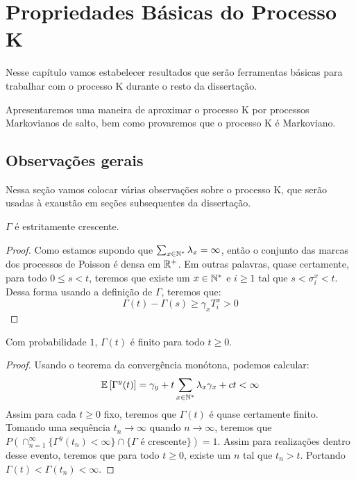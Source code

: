 \chapter{Propriedades Básicas do Processo K}
\label{cap:propriedades}

Nesse capítulo vamos estabelecer resultados que serão ferramentas
básicas para trabalhar com o processo K durante o resto da
dissertação.

Apresentaremos uma maneira de aproximar o processo K por processos
Markovianos de salto, bem como provaremos que o processo K é
Markoviano.


\section{Observações gerais}
\label{sec:observacoes}

Nessa seção vamos colocar várias observações sobre o processo K, que
serão usadas à exaustão em seções subsequentes da dissertação.

\begin{proposicao}
  \label{prop:gamma-crescente}
  $\Gamma$ é \qc estritamente crescente.
\end{proposicao}
\begin{proof}
  Como estamos supondo que $\sum_{x \in {\mathbb{N^*}}} \lambda_x = \infty$,
  então o conjunto das marcas dos processos de Poisson é \qc densa em
  ${\mathbb{R}}^+$. Em outras palavras, quase certamente, para todo $0 \leq s <
  t$, teremos que existe um $x \in {\mathbb{N^*}}$ e $i \geq 1$ tal que $s <
  \sigma^x_i < t$. Dessa forma usando a definição de $\Gamma$, teremos
  que:
  \begin{displaymath}
    \Gamma(t) - \Gamma(s) \geq \gamma_x T^x_i > 0
  \end{displaymath}
\end{proof}

\begin{proposicao}
  \label{prop:gamma-finita}
  Com probabilidade $1$, $\Gamma(t)$ é finito para todo $t \geq 0$.
\end{proposicao}
\begin{proof}
  Usando o teorema da convergência monótona, podemos calcular:
  \begin{displaymath}
    {\mathbb{E}} \left[\Gamma^y(t) \right] = \gamma_y + t \sum_{x \in {\mathbb{N^*}}}
    \lambda_x \gamma_x + ct < \infty
  \end{displaymath}
  Assim para cada $t \geq 0$ fixo, teremos que $\Gamma(t)$ é quase
  certamente finito. Tomando uma sequência $t_n \to \infty$ quando $n
  \to \infty$, teremos que $P(\cap_{n = 1}^{\infty} \{ \Gamma^y (t_n)
  < \infty \} \cap \{ \Gamma \textrm{ é crescente}\}) = 1$. Assim para
  realizações dentro desse evento, teremos que para todo $t \geq 0$,
  existe um $n$ tal que $t_n > t$. Portando $\Gamma(t) < \Gamma(t_n) <
  \infty$.
\end{proof}


